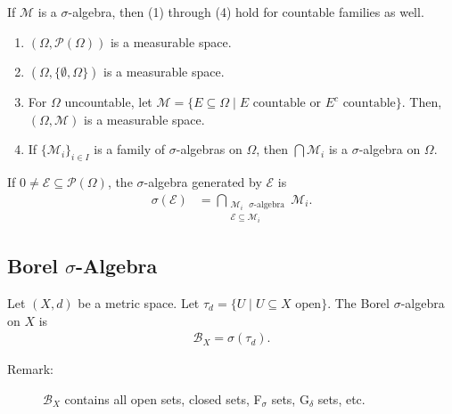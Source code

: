 \documentclass[10pt]{extarticle}
\begin{document}
  If $\mathcal{M}$ is a $\sigma$-algebra, then (1) through (4) hold for countable families as well.
  \begin{enumerate}[(1)]
    \item $(\Omega,\mathcal{P}(\Omega))$ is a measurable space.
    \item $(\Omega,\{\emptyset,\Omega\})$ is a measurable space.
    \item For $\Omega$ uncountable, let $\mathcal{M} = \{E\subseteq \Omega\mid E\text{ countable or }E^c\text{ countable}\}$. Then, $(\Omega,\mathcal{M})$ is a measurable space.
    \item If $\{\mathcal{M}_i\}_{i\in I}$ is a family of $\sigma$-algebras on $\Omega$, then $\bigcap \mathcal{M}_i$ is a $\sigma$-algebra on $\Omega$.
  \end{enumerate}
  If $0\neq \mathcal{E}\subseteq \mathcal{P}(\Omega)$, the $\sigma$-algebra generated by $\mathcal{E}$ is
  \begin{align*}
    \sigma(\mathcal{E}) &= \bigcap_{\substack{\mathcal{M}_i\text{ $\sigma$-algebra}\\\mathcal{E}\subseteq \mathcal{M}_i}}\mathcal{M}_i.
  \end{align*}
  \subsection{Borel $\sigma$-Algebra}%
  Let $(X,d)$ be a metric space. Let $\tau_d = \{U\mid U\subseteq X\text{ open}\}$. The Borel $\sigma$-algebra on $X$ is
  \begin{align*}
    \mathcal{B}_X = \sigma(\tau_d).
  \end{align*}
  \begin{description}
    \item[Remark:] $\mathcal{B}_X$ contains all open sets, closed sets, F$_{\sigma}$ sets, G$_{\delta}$ sets, etc.
  \end{description}
\end{document}
